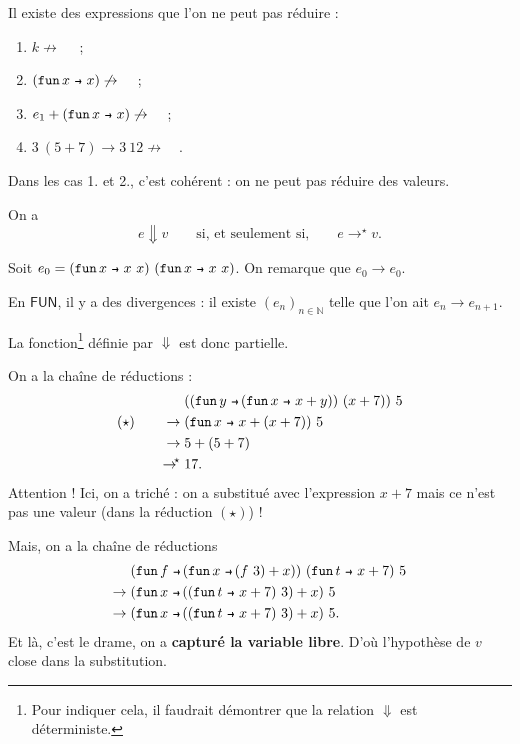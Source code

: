 \documentclass[../main]{subfiles}
\begin{document}
  \begin{rmk}
    Il existe des expressions que l'on ne peut pas réduire :
    \begin{enumerate}
      \item $k \not\to \quad$ ;
      \item $(\fun x x) \not\to \quad$ ;
      \item $e_1 + (\fun x x) \not\to \quad$ ;
      \item $3\ (5 + 7) \to 3\ 12 \not\to \quad$.
    \end{enumerate}

    Dans les cas 1. et 2., c'est cohérent : on ne peut pas réduire des valeurs.
  \end{rmk}


  \begin{lem}
    On a \[
    e \Downarrow v \quad\quad \text{si, et seulement si,} \quad\quad e \to^\star v
    .\] 
  \end{lem}

  \begin{rmk}
    Soit $e_0 = (\fun x x\ x)\ (\fun x x\ x)$.
    On remarque que $e_0 \to e_0$.

    En $\mathsf{FUN}$, il y a des divergences : il existe $(e_n)_{n \in \mathds{N}}$ telle que l'on ait $e_n \to e_{n+1}$.
  \end{rmk}

  La fonction\footnote{Pour indiquer cela, il faudrait démontrer que la relation $\Downarrow$ est déterministe.} définie par $\Downarrow$ est donc partielle.


  \begin{rmk}
    On a la chaîne de réductions :
    \begin{align*}
      &((\fun y (\fun x x + y))\ (x+7))\ 5\\
      (\star)\quad\quad\to\;&(\fun x x + (x+7))\ 5\\
      \to\;&5 + (5 + 7)\\
      \to\mathllap{^\star}\;& 17
    .\end{align*}
    Attention ! Ici, on a triché : on a substitué avec l'expression $x + 7$ mais ce n'est pas une valeur (dans la réduction $(\star)$) !

    Mais, on a la chaîne de réductions 
    \begin{align*}
      &(\fun f (\fun x (f\ 3) + x))\ (\fun t x + 7)\ 5\\
      \to\;& (\fun x ((\fun t x + 7)\ 3) + x)\ 5\\
      \to\;& (\fun x ((\fun t x + 7)\ 3) + x)\ 5
    .\end{align*}
    Et là, c'est le drame, on a \textbf{capturé la variable libre}.
    D'où l'hypothèse de $v$ close dans la substitution.
  \end{rmk}
\end{document}

